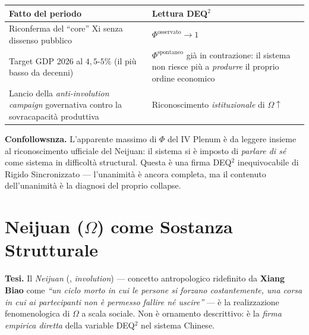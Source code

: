 {\def\LTcaptype{none} %
{\small\begin{longtable}[]{@{}
  >{\raggedright\arraybackslash}p{}
  >{\raggedright\arraybackslash}p{}@{}}
\toprule\noalign{}
\begin{minipage}[b]{\linewidth}\raggedright
Fatto del periodo
\end{minipage} & \begin{minipage}[b]{\linewidth}\raggedright
Lettura DEQ$^2$
\end{minipage} \\
\midrule\noalign{}
\endhead
\bottomrule\noalign{}
\endlastfoot
Riconferma del ``core'' Xi senza dissenso pubblico &
\(\Phi^{\text{osservato}} \to 1\) \\
Target GDP 2026 al \(4{,}5\)-\(5\%\) (il più basso da decenni) &
\(\Phi^{\text{spontaneo}}\) già in contrazione: il sistema non riesce
più a \emph{produrre} il proprio ordine economico \\
Lancio della \emph{anti-involution campaign} governativa contro la
sovracapacità produttiva & Riconoscimento \emph{istituzionale} di
\(\Omega \uparrow\) \\
\end{longtable}}
}

\Proved{} \textbf{Confollowsnza.} L'apparente massimo di \(\Phi\) del IV
Plenum è da leggere insieme al riconoscimento ufficiale del Neijuan: il
sistema si è imposto di \emph{parlare di sé} come sistema in difficoltà
structural. Questa è una firma DEQ$^2$ inequivocabile di Rigido
Sincronizzato --- l'unanimità è ancora completa, ma il contenuto
dell'unanimità è la diagnosi del proprio collapse.



\section{\texorpdfstring{Neijuan (\(\Omega\)) come Sostanza
Strutturale}{Neijuan (\textbackslash Omega) come Sostanza Strutturale}}\label{neijuan-omega-come-sostanza-structural}

\Hypoth{} \textbf{Tesi.} Il \emph{Neijuan} (, \emph{involution}) ---
concetto antropologico ridefinito da \textbf{Xiang Biao} come \emph{``un
ciclo morto in cui le persone si forzano costantemente, una corsa in cui
ai partecipanti non è permesso fallire né uscire''} --- è la
realizzazione fenomenologica di \(\Omega\) a scala sociale. Non è
ornamento descrittivo: è la \emph{firma empirica diretta} della
variable DEQ$^2$ nel sistema Chinese.

